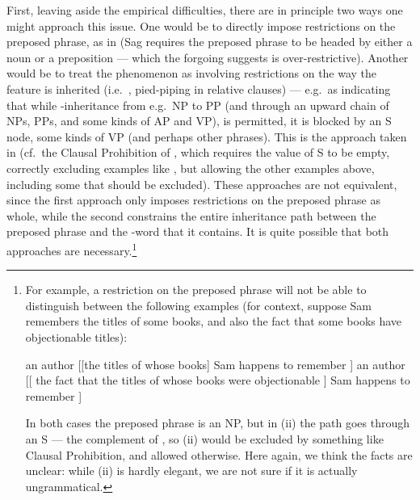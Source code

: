 \documentclass[output=paper,biblatex,babelshorthands,newtxmath,draftmode,colorlinks,citecolor=brown]{langscibook}
\begin{document}
First, leaving aside the empirical difficulties, there are in principle two ways one might
approach this issue. One would be to directly impose restrictions on the preposed phrase,
as in  (Sag requires the preposed phrase to be headed by either a noun
or a preposition --- which the forgoing suggests is over-restrictive). Another would be to
treat the phenomenon as involving restrictions on the way the  feature is
inherited (i.e.\ , pied-piping in relative clauses) --- e.g.\ as
indicating that while -inheritance from e.g.\ NP to PP (and through an upward
chain of NPs, PPs, and some kinds of AP and VP), is permitted, it is blocked by an S node,
some kinds of VP (and perhaps other phrases).  This is the approach taken in  (cf.\
the Clausal  Prohibition of \citealt[220]{Pollard:Sag:94}, which requires the
\attrib{rel} value of S to be empty, correctly excluding examples like \pref{x:rc-28}, but
allowing the other examples above, including some that should be excluded). These
approaches are not equivalent, since the first approach only imposes restrictions on the
preposed phrase as whole, while the second constrains the entire inheritance path between
the preposed phrase and the \lic{wh}-word that it contains. It is quite possible that both
approaches are necessary.\footnote{For example, a restriction on the preposed phrase will
  not be able to distinguish between the following examples (for context, suppose Sam
  remembers the titles of some books, and also the fact that some books have objectionable
  titles):
  \begin{exe}
    \ex an author [[the titles of whose books] Sam happens to remember \trace{} ]
    \ex an author [[ the fact that the titles of whose books were objectionable ]  Sam happens to remember \trace{} ]
  \end{exe}
  In both cases the preposed phrase is an NP, but in (ii) the \isi{relative
    inheritance} path goes through an S --- the complement of \lic{fact}, so (ii) would be
  excluded by something like Clausal \attrib{rel} Prohibition, and allowed otherwise. Here
  again, we think the facts are unclear: while (ii) is hardly elegant, we are not sure if
  it is actually ungrammatical.}
\end{document}
